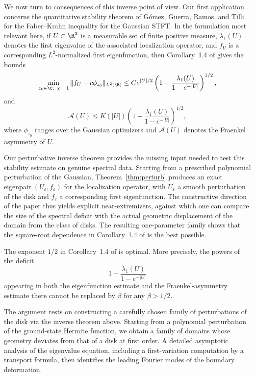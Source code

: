 We now turn to consequences of this inverse point of view. Our first application concerns the quantitative stability theorem of G\'omez, Guerra, Ramos, and Tilli for the Faber--Krahn inequality for the Gaussian STFT. In the formulation most relevant here, if $U\subset \R^2$ is a measurable set of finite positive measure, $\lambda_1(U)$ denotes the first eigenvalue of the associated localization operator, and $f_U$ is a corresponding $L^2$-normalized first eigenfunction, then Corollary~1.4 of \cite{Gomez-Guerra-Ramos-Tilli} gives the bounds
\[
\min_{z_0\in\C,\ |c|=1}\|f_U-c\phi_{z_0}\|_{L^2(\R)}
\leq
C e^{|U|/2}
\left(
1-\frac{\lambda_1(U)}{1-e^{-|U|}}
\right)^{1/2},
\]
and
\[
\mathcal A(U)
\leq
K(|U|)
\left(
1-\frac{\lambda_1(U)}{1-e^{-|U|}}
\right)^{1/2},
\]
where $\phi_{z_0}$ ranges over the Gaussian optimizers and $\mathcal A(U)$ denotes the Fraenkel asymmetry of $U$.

Our perturbative inverse theorem provides the missing input needed to test this stability estimate on genuine spectral data. Starting from a prescribed polynomial perturbation of the Gaussian, Theorem~\ref{thm:perturb} produces an exact eigenpair $(U_\varepsilon,f_\varepsilon)$ for the localization operator, with $U_\varepsilon$ a smooth perturbation of the disk and $f_\varepsilon$ a corresponding first eigenfunction. The constructive direction of the paper thus yields explicit near-extremizers, against which one can compare the size of the spectral deficit with the actual geometric displacement of the domain from the class of disks. The resulting one-parameter family shows that the square-root dependence in Corollary~1.4 of \cite{Gomez-Guerra-Ramos-Tilli} is the best possible.

\begin{theorem} \label{thm:GGRT-sharp}
The exponent $1/2$ in Corollary~1.4 of \cite{Gomez-Guerra-Ramos-Tilli} is optimal. More precisely, the powers of the deficit
\[
1-\frac{\lambda_1(U)}{1-e^{-|U|}}
\]
appearing in both the eigenfunction estimate and the Fraenkel-asymmetry estimate there cannot be replaced by $\beta$ for any $\beta>1/2$.
\end{theorem}

The argument rests on constructing a carefully chosen family of perturbations of the disk via the inverse theorem above. Starting from a polynomial perturbation of the ground-state Hermite function, we obtain a family of domains whose geometry deviates from that of a disk at first order. A detailed asymptotic analysis of the eigenvalue equation, including a first-variation computation by a transport formula, then identifies the leading Fourier modes of the boundary deformation.

